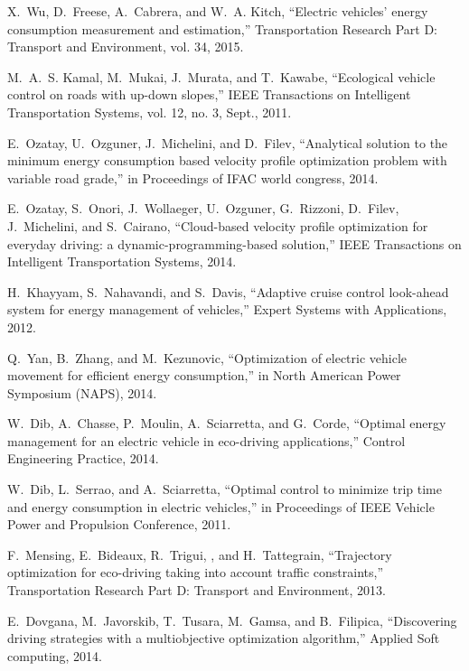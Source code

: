 X.~Wu, D.~Freese, A.~Cabrera, and W.~A. Kitch, ``Electric vehicles’ energy
  consumption measurement and estimation,'' Transportation Research Part
  D: Transport and Environment, vol. 34, 2015.

M.~A.~S. Kamal, M.~Mukai, J.~Murata, and T.~Kawabe, ``Ecological vehicle
  control on roads with up-down slopes,'' IEEE Transactions on Intelligent
  Transportation Systems, vol. 12, no. 3, Sept., 2011.

E.~Ozatay, U.~Ozguner, J.~Michelini, and D.~Filev, ``Analytical solution to the
  minimum energy consumption based velocity profile optimization problem with
  variable road grade,'' in Proceedings of IFAC world congress, 2014.

E.~Ozatay, S.~Onori, J.~Wollaeger, U.~Ozguner, G.~Rizzoni, D.~Filev,
  J.~Michelini, and S.~Cairano, ``Cloud-based velocity profile optimization for
  everyday driving: a dynamic-programming-based solution,'' IEEE
  Transactions on Intelligent Transportation Systems, 2014.

H.~Khayyam, S.~Nahavandi, and S.~Davis, ``Adaptive cruise control look-ahead
  system for energy management of vehicles,'' Expert Systems with
  Applications, 2012.

Q.~Yan, B.~Zhang, and M.~Kezunovic, ``Optimization of electric vehicle movement
  for efficient energy consumption,'' in North American Power Symposium
  (NAPS), 2014.

W.~Dib, A.~Chasse, P.~Moulin, A.~Sciarretta, and G.~Corde, ``Optimal energy
  management for an electric vehicle in eco-driving applications,'' 
  Control Engineering Practice, 2014.

W.~Dib, L.~Serrao, and A.~Sciarretta, ``Optimal control to minimize trip time
  and energy consumption in electric vehicles,'' in Proceedings of IEEE
  Vehicle Power and Propulsion Conference, 2011.

F.~Mensing, E.~Bideaux, R.~Trigui, , and H.~Tattegrain, ``Trajectory
  optimization for eco-driving taking into account traffic constraints,'' 
  Transportation Research Part D: Transport and Environment, 2013.

E.~Dovgana, M.~Javorskib, T.~Tusara, M.~Gamsa, and B.~Filipica, ``Discovering
  driving strategies with a multiobjective optimization algorithm,'' 
  Applied Soft computing, 2014.

